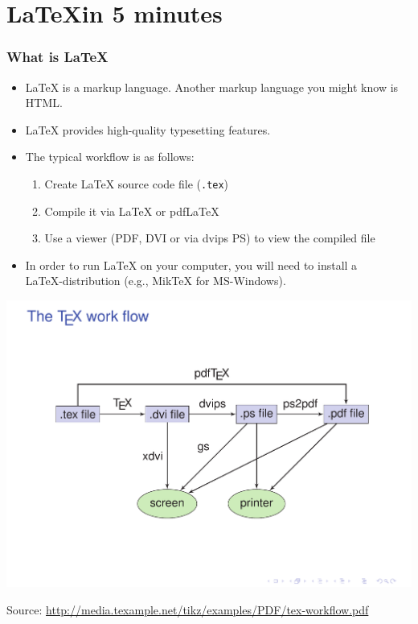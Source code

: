\documentclass[bigger]{beamer}
\begin{document}
\section{\LaTeX in 5 minutes}
\label{sec-3}
\begin{frame}
\frametitle{What is \LaTeX}
\label{sec-3_1}
\begin{itemize}

\item \LaTeX{} is a markup language. Another markup language you might know is HTML.\\
\label{sec-3_1_1}%
\item \LaTeX{} provides high-quality typesetting features.\\
\label{sec-3_1_2}%
\item The typical workflow is as follows:
\label{sec-3_1_3}%
\begin{enumerate}
\item Create \LaTeX{} source code file (\texttt{.tex})
\item Compile it via \LaTeX{} or pdf\LaTeX
\item Use a viewer (PDF, DVI or via dvips PS) to view the compiled file
\end{enumerate}

\item In order to run \LaTeX{} on your computer, you will need to install a\\
\label{sec-3_1_4}%
\LaTeX-distribution (e.g., Mik\TeX{} for MS-Windows).  

 

\end{itemize} %
\end{frame}
\begin{frame}


\includegraphics[width=\textwidth]{../graphs/tex-workflow.pdf}

Source: \href{http://media.texample.net/tikz/examples/PDF/tex-workflow.pdf}{http://media.texample.net/tikz/examples/PDF/tex-workflow.pdf}
\end{frame}
\end{document}
